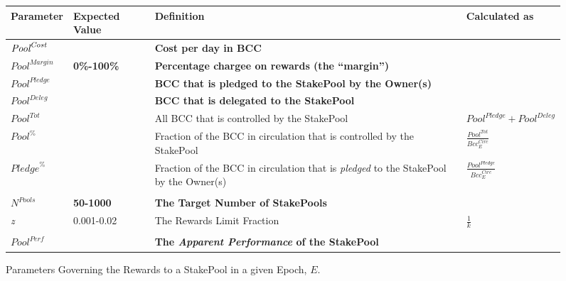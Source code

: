 \documentclass[11pt,a4paper,dvipsnames,twosided,final]{article}
\newcommand{\bcc}{BCC{}}
\newcommand{\bcc}[1]{Bcc}
\begin{document}
\begin{figure}[h!]
\begin{center}
\begin{tabular}{||l|l|p{6cm}|l||}
  \hline \hline
\textbf{Parameter} & \textbf{Expected Value} & \textbf{Definition} & \textbf{Calculated as} \\\hline
\textbf{\color{red} $\textit{\textit{Pool}}^{\textit{Cost}}$} &  & \textbf{\color{red} Cost per day in \bcc{}} & \\\hline
\textbf{\color{red} ${\textit{Pool}}^{\textit{Margin}}$} &  \textbf{\color{red} 0\%-100\%} & \textbf{\color{red} Percentage chargee on rewards (the ``margin'')} & \\\hline
\textbf{\color{red} ${Pool}^\textit{Pledge}$} & & \textbf{\color{red} \bcc{} that is pledged to the StakePool by the Owner(s)} & \\\hline
\textbf{\color{blue} ${\textit{Pool}}^\textit{Deleg}$} & & \textbf{\color{blue} \bcc{} that is delegated to the StakePool} & \\\hline
${\textit{Pool}}^{Tot}$ & & All \bcc{} that is controlled by the StakePool & ${\textit{Pool}}^\textit{Pledge} + {\textit{Pool}}^\textit{Deleg}$ \\\hline
${\textit{Pool}}^\%$ & & Fraction of the \bcc{} in circulation that is controlled by the StakePool & {\large $\frac{{\textit{Pool}}^{Tot}}{\textit{Bcc}^{\textit{Circ}}_E}$} \\\hline
${\textit{Pledge}}^\%$ & & Fraction of the \bcc{} in circulation that is \emph{pledged} to the StakePool by the Owner(s) & {\large $\frac{{\textit{Pool}}^{Pledge}}{\textit{Bcc}^{\textit{Circ}}_E}$} \\\hline
&&&  \\\hline
\textbf{\color{green} $N^{\textit{Pools}}$} & \textbf{\color{green} 50-1000} & \textbf{\color{green} The Target Number of StakePools} & \\\hline
\emph{z} & 0.001-0.02 & The Rewards Limit Fraction & $\frac{1}{k}$ \\\hline
&&&  \\\hline
\textbf{\color{cyan} $\textit{Pool}^{\textit{Perf}}$} & & \textbf{\color{cyan} The \emph{Apparent Performance} of the StakePool} & \\\hline
  \hline
\end{tabular}
\end{center}
\caption{Parameters Governing the Rewards to a StakePool in a given Epoch, $E$.}
\label{fig:rewards-MainNet}
\end{figure}
\end{document}
